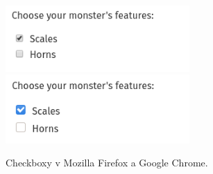 \begin{figure}[!htb] \centering
  \includegraphics[width=70mm]{../img/chrome_checkbox.png}
  \includegraphics[width=70mm]{../img/firefox_checkbox.png}
  \caption{Checkboxy v Mozilla Firefox a Google Chrome.}
  \label{fig:browser_checkboxes}
\end{figure}

